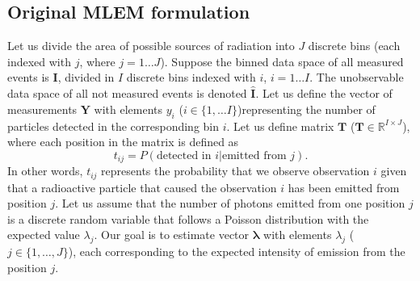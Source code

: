 \subsection{Original MLEM formulation}
Let us divide the area of possible sources of radiation into $J$ discrete bins (each indexed with $j$, where $j = 1 \dotsc J$).
Suppose the binned data space of all measured events is $\mathbf{I}$, divided in $I$ discrete bins indexed with $i$, $i = 1 \dotsc I$.
The unobservable data space of all not measured events is denoted $\mathbf{\hat{I}}$.
Let us define the vector of measurements $\mathbf{Y}$ with elements $y_{i}$ ($i \in \{1, \dots I\}$)representing the number of particles detected in the corresponding bin $i$.
Let us define matrix $\mathbf{T}$ ($\mathbf{T} \in \mathbb{R}^{I \times J}$), where each position in the matrix is defined as
\begin{equation}
  t_{ij} =  P(\textrm{detected in } i | \textrm{emitted from } j).
\end{equation}
In other words, $t_{ij}$ represents the probability that we observe observation $i$ given that a radioactive particle that caused the observation $i$ has been emitted from position $j$.
Let us assume that the number of photons emitted from one position $j$ is a discrete random variable that follows a Poisson distribution with the expected value $\lambda_{j}$.
Our goal is to estimate vector $\bm{\lambda}$ with elements $\lambda_{j}$ ($j \in \{1 , \dots, J\}$), each corresponding to the expected intensity of emission from the position $j$.

